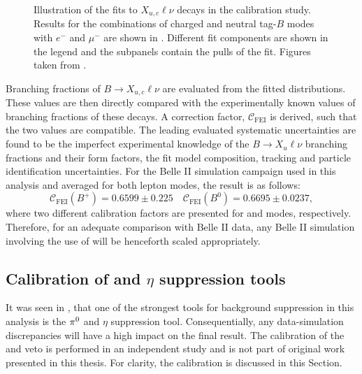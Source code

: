 \begin{figure}[htbp!]
{{        }
    }
    \caption{\label{fig:fei_calib} Illustration of the fits to \B\to$X_{u,c}\ell\nu$ decays in the \FEI calibration study.
    Results for the combinations of charged and neutral tag-$B$ modes with $e^-$ and $\mu^-$
    are shown in .
    Different fit components are shown in the legend and the subpanels contain the pulls of the fit.
    Figures taken from \cite{Belle-II:2020fst}.
    }
\end{figure}

Branching fractions of $B\rightarrow X_{u,c}\ell\nu$ are evaluated from the fitted distributions.
These values are then directly compared with the experimentally known values of branching fractions of these decays.
A correction factor, $\mathcal{C}_{\mathrm{FEI}}$ is derived, such that the two values are compatible.
The leading evaluated systematic uncertainties are found to be the imperfect experimental knowledge of the $B\rightarrow X_u\ell\nu$ branching fractions and their form factors, the fit model composition, tracking and particle identification uncertainties.
For the Belle II simulation campaign used in this analysis and averaged for both lepton modes, the result is as follows:
\begin{equation}\label{eq:fei_calibration}
    \mathcal{C}_{\mathrm{FEI}}(B^+) = 0.6599 \pm 0.225 \quad \mathcal{C}_{\mathrm{FEI}}(B^0) = 0.6695 \pm 0.0237,
\end{equation}
where two different calibration factors are presented for \feiBp and \feiBz modes, respectively.
Therefore, for an adequate comparison with Belle II data, any Belle II simulation involving the use of \FEI will be henceforth scaled appropriately.

\subsection{Calibration of \texorpdfstring{\piz}{pi0} and \texorpdfstring{$\eta$}{eta} suppression tools}\label{sec:piz_eta_calibration}
It was seen in , that one of the strongest tools for background suppression in this analysis is the $\pi^0$ and $\eta$ suppression tool.
Consequentially, any data-simulation discrepancies will have a high impact on the final result.
The calibration of the \piz and \eta veto is performed in an independent study and is not part of original work presented in this thesis.
For clarity, the calibration is discussed in this Section. 